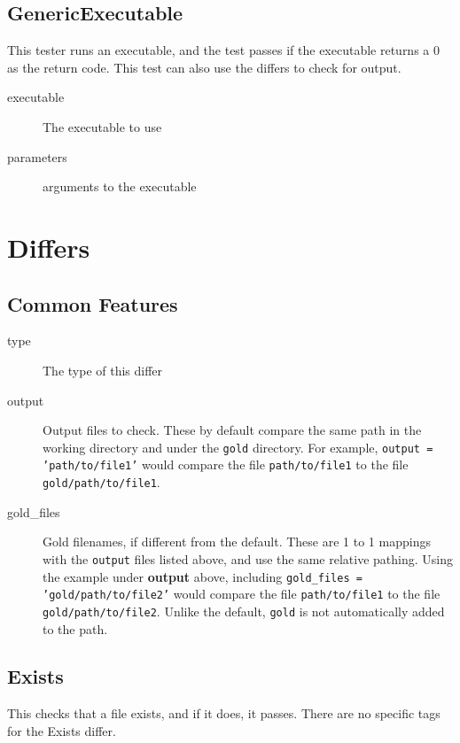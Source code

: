 \documentclass{article}
\begin{document}
\subsection{GenericExecutable}

This tester runs an executable, and the test passes if the executable
returns a 0 as the return code.  This test can also use the differs to
check for output.

\begin{description}
  \item[executable] The executable to use
  \item[parameters] arguments to the executable
\end{description}

\section{Differs}

\subsection{Common Features}

\begin{description}
  \item[type] The type of this differ
  \item[output] Output files to check. These by default compare the same path in the working directory
      and under the \texttt{gold} directory. For example, \texttt{output = 'path/to/file1'} would compare
      the file \texttt{path/to/file1} to the file \texttt{gold/path/to/file1}.
  \item[gold\_files] Gold filenames, if different from the default. These are 1 to 1 mappings with the
      \texttt{output} files listed above, and use the same relative pathing. Using the example under
      \textbf{output} above, including \texttt{gold\_files = 'gold/path/to/file2'} would compare the file
      \texttt{path/to/file1} to the file \texttt{gold/path/to/file2}. \nb Unlike the default,
      \texttt{gold} is not automatically added to the  path.
\end{description}

\subsection{Exists}

This checks that a file exists, and if it does, it passes.  There are
no specific tags for the Exists differ.
\end{document}
